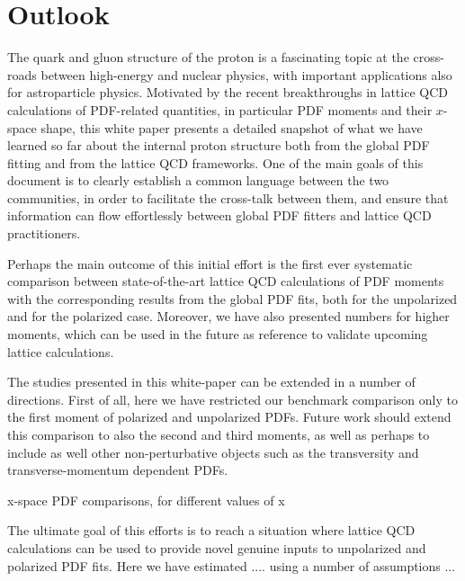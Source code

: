 \section{Outlook}
\label{sec:outlook}

The quark and gluon structure of the proton is a fascinating topic
at the cross-roads between high-energy and nuclear physics, with important
applications also for astroparticle physics.
%
Motivated by the recent breakthroughs in lattice QCD calculations of
PDF-related quantities, in particular PDF moments and their $x$-space
shape, this white paper presents a detailed snapshot of what we have learned so far
about the internal proton structure both from the global PDF fitting and from
the lattice QCD frameworks.
%
One of the main goals of this document is to clearly establish a common language
between the two communities, in order to facilitate the cross-talk between them,
and ensure that information can flow effortlessly between global PDF fitters
and lattice QCD practitioners.

Perhaps the main outcome of this initial effort is the first ever systematic
comparison between state-of-the-art lattice QCD calculations of PDF moments with
the corresponding results from the global PDF fits, both
for the unpolarized and for the polarized case.
%
Moreover, we have also presented numbers for higher moments, which can be used
in the future as reference to validate upcoming lattice calculations.

The studies presented in this white-paper can be extended in a number of directions.
%
First of all, here we have restricted our benchmark comparison only to the
first moment of polarized and unpolarized
PDFs.
%
Future work should extend this comparison to also the second and third moments,
as well as perhaps to include as well other non-perturbative objects
such as the transversity and transverse-momentum dependent PDFs.

x-space PDF comparisons, for different values of x

The ultimate goal of this efforts is to reach a situation where
lattice QCD calculations can be used to provide novel genuine inputs
to unpolarized and polarized PDF fits.
%
Here we have estimated .... using a number of assumptions ...


